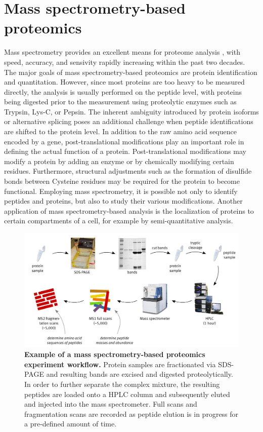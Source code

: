 \section{Mass spectrometry-based proteomics}

Mass spectrometry provides an excellent means for proteome analysis
\citep{Aebersold2003}, with speed, accuracy, and sensivity rapidly increasing
within the past two decades.
The major goals of mass spectrometry-based proteomics are protein 
identification and quantitation.
However, since most proteins are too heavy to be measured directly, the
analysis is usually performed on the peptide level, with proteins being digested
prior to the measurement using proteolytic enzymes such as Trypsin, Lys-C, or 
Pepsin. 
The inherent ambiguity introduced by protein isoforms or alternative splicing
poses an additional challenge when peptide identifications are shifted to
the protein level.
In addition to the raw amino acid sequence encoded by a gene, post-translational
modifications play an important role in defining the actual function of a
protein.
Post-translational modifications may modify a protein by adding an enzyme or by
chemically modifying certain residues.
Furthermore, structural adjustments such as the formation of disulfide 
bonds between Cysteine residues may be required for the protein to become 
functional.
Employing mass spectrometry, it is possible not only to identify peptides and
proteins, but also to study their various modifications.
Another application of mass spectrometry-based analysis is the localization of
proteins to certain compartments of a cell, for example by semi-quantitative
analysis.

\begin{figure}
\includegraphics[width=\textwidth]{figures/Proteomics.jpg}
\caption{
{\bf Example of a mass spectrometry-based proteomics experiment workflow.} 
Protein samples are fractionated via SDS-PAGE and resulting bands are excised and
digested proteolytically. In order to further separate the complex mixture, 
the resulting peptides are loaded onto a HPLC column and subsequently eluted 
and injected into the mass spectrometer. Full scans and fragmentation scans
are recorded as peptide elution is in progress for a pre-defined amount of time.
}
\label{fig:proteomics-overview}
\end{figure}

